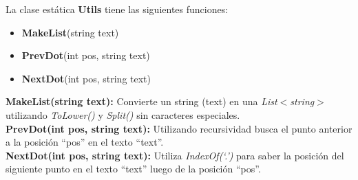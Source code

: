 \documentclass[10pt, letterpaper]{article}
\begin{document}
    La clase estática \textbf{Utils} tiene las siguientes funciones:
    \begin{itemize}
        \item  \textbf{MakeList}(string text)
        \item \textbf{PrevDot}(int pos, string text)
        \item \textbf{NextDot}(int pos, string text)
    \end{itemize}
    \textbf{MakeList(\textnormal{string text}):} Convierte un string (text) en una \textit{List$<$string$>$} utilizando \textit{ToLower()} y
    \textit{Split()} sin caracteres especiales. \\
    \textbf{PrevDot(\textnormal{int pos, string text}):} Utilizando recursividad busca el punto anterior a la posición
    “pos” en el texto “text”.\\
    \textbf{NextDot(\textnormal{int pos, string text}):} Utiliza \textit{IndexOf(‘.’)} para saber la posición del siguiente punto 
    en el texto “text” luego de la posición “pos”.\\
\end{document}
